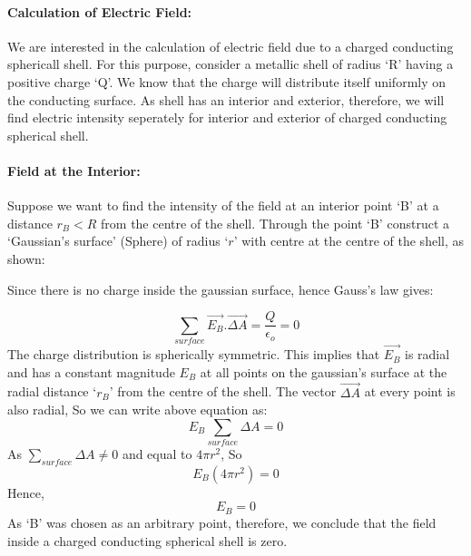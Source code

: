 \paragraph{Calculation of Electric Field:}
We are interested in the calculation of electric field due to a
charged conducting sphericall shell. For this purpose,
consider a metallic shell of radius ‘R’ having a positive charge ‘Q’.
We know that the charge will distribute itself uniformly on the
conducting surface. As shell has an interior and exterior,
therefore, we will find electric intensity seperately for
interior and exterior of charged conducting spherical shell.
\paragraph{Field at the Interior:}
Suppose we want to find the intensity of the field at an interior
point ‘B’ at a distance $r_{B} < R$ from the centre of the shell.
Through the point ‘B’ construct a ‘Gaussian’s surface’ (Sphere)
of radius ‘$r$’ with centre at the centre of the shell, as shown:


Since there is no charge inside the gaussian surface,
hence Gauss’s law gives:

\begin{equation}
  \sum_{surface} \vec{E_{B}}.\vec{\Delta A}  = \frac{Q}{\epsilon_{o}} = 0 \nonumber
\end{equation}
The charge distribution is spherically symmetric. This implies that $\vec{E_{B}}$
is radial and has a constant magnitude $E_{B}$ at all points on the
gaussian’s surface at the radial distance ‘$r_{B}$’ from the centre of
the shell. The vector $\vec{\Delta A}$ at every point is also radial,
So we can write above equation as:
\begin{equation}
  E_{B}\sum_{surface} \Delta A = 0 \nonumber
\end{equation}
As $\sum_{surface} \Delta A \neq 0$ and equal to $4\pi r^{2}$, So
\begin{equation}
  E_{B}(4\pi r^{2}) = 0 \nonumber
\end{equation}
Hence,
\begin{equation}
  E_{B} = 0 \nonumber
\end{equation}
As ‘B’ was chosen as an arbitrary point, therefore, we conclude
that the field inside a charged conducting spherical shell is zero.
